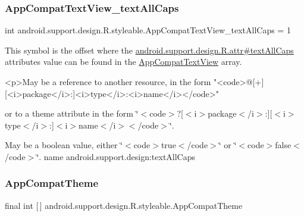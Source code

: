 \subsubsection{\texorpdfstring{App\+Compat\+Text\+View\+\_\+text\+All\+Caps}{AppCompatTextView\_textAllCaps}}
{\footnotesize\ttfamily int android.\+support.\+design.\+R.\+styleable.\+App\+Compat\+Text\+View\+\_\+text\+All\+Caps = 1\hspace{0.3cm}{\ttfamily [static]}}

This symbol is the offset where the \hyperlink{classandroid_1_1support_1_1design_1_1R_1_1attr_ab79e12973dd7b26f7ad9ef87ae44ecfa}{android.\+support.\+design.\+R.\+attr\#text\+All\+Caps} attribute\textquotesingle{}s value can be found in the \hyperlink{classandroid_1_1support_1_1design_1_1R_1_1styleable_a4f8449fe92fa53cd1fd4547247fe52b6}{App\+Compat\+Text\+View} array.

\begin{DoxyVerb}      <p>May be a reference to another resource, in the form "<code>@[+][<i>package</i>:]<i>type</i>:<i>name</i></code>"
\end{DoxyVerb}
 or to a theme attribute in the form \char`\"{}$<$code$>$?\mbox{[}$<$i$>$package$<$/i$>$\+:\mbox{]}\mbox{[}$<$i$>$type$<$/i$>$\+:\mbox{]}$<$i$>$name$<$/i$>$$<$/code$>$\char`\"{}. 

May be a boolean value, either \char`\"{}$<$code$>$true$<$/code$>$\char`\"{} or \char`\"{}$<$code$>$false$<$/code$>$\char`\"{}.  name android.\+support.\+design\+:text\+All\+Caps \mbox{\label{classandroid_1_1support_1_1design_1_1R_1_1styleable_afb351dc8de20cbd4c89abe360373010c}} 
\subsubsection{\texorpdfstring{App\+Compat\+Theme}{AppCompatTheme}}
{\footnotesize\ttfamily final int \mbox{[}$\,$\mbox{]} android.\+support.\+design.\+R.\+styleable.\+App\+Compat\+Theme\hspace{0.3cm}{\ttfamily [static]}}

